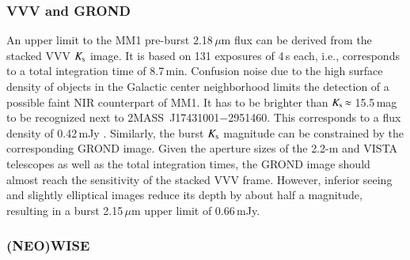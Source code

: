 \subsubsection{VVV and GROND}\label{vg}
An upper limit to the MM1 pre-burst 2.18\,$\mu$m flux can be derived from the stacked VVV $K_{\rm s}$ image. It is based on 131 exposures of 4\,s each, i.e., corresponds to a total integration time of 8.7\,min. Confusion noise due to the high surface density of objects in the Galactic center neighborhood limits the detection of a possible faint NIR counterpart of MM1. It has to be brighter than $K_{\rm s}\,{\approx}\,$15.5\,mag to be recognized next to 2MASS~J17431001$-$2951460. This corresponds to a flux density of 0.42\,mJy \citep{2003AJ....126.1090C}. Similarly, the burst $K_{\rm s}$ magnitude can be constrained by the corresponding GROND image. Given the aperture sizes of the 2.2-m and VISTA telescopes as well as the total integration times, the GROND image should almost reach the sensitivity of the stacked VVV frame. However, inferior seeing and slightly elliptical images reduce its depth by about half a magnitude, resulting in a burst 2.15\,$\mu$m upper limit of 0.66\,mJy.

\subsubsection{(NEO)WISE}\label{nw}

